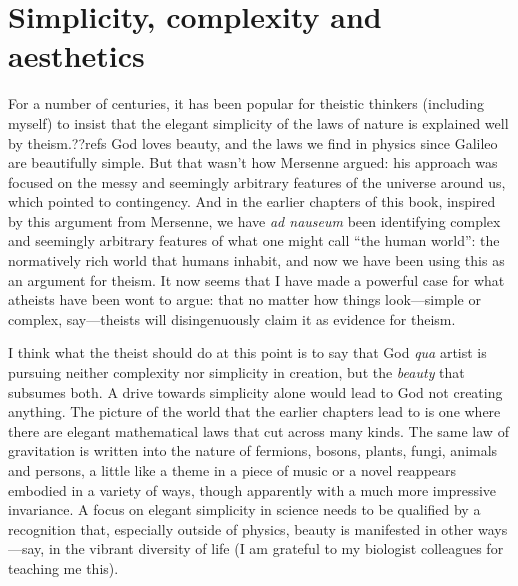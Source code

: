 \section{Simplicity, complexity and aesthetics}
For a number of centuries, it has been popular for theistic thinkers (including myself) to insist that the elegant simplicity of the laws of nature 
is explained well by theism.??refs God loves beauty, and the laws we find in physics since Galileo are beautifully simple.
But that wasn't how Mersenne argued: his approach was focused on the messy and seemingly arbitrary features of the universe
around us, which pointed to contingency. And in the earlier chapters of this book, inspired by this argument from Mersenne, we have 
\textit{ad nauseum} been identifying complex and seemingly arbitrary features of what one might call ``the human world'': 
the normatively rich world that humans inhabit, and now we have been using this as an argument for theism. It now seems that I have made a powerful case for what atheists have been wont to argue: that no matter how things look---simple or complex, say---theists will disingenuously claim it as evidence for theism.

I think what the theist should do at this point is to say that God \textit{qua} artist is pursuing neither complexity nor simplicity 
in creation, but the \textit{beauty} that subsumes both. A drive towards simplicity alone would lead to God not creating anything. 
The picture of the world that the earlier chapters lead to is one where there 
are elegant mathematical laws that cut across many kinds. The same law of gravitation is written into the nature of fermions, bosons, plants, fungi, animals and persons, a little like a theme in a piece of music or a novel reappears embodied in a variety 
of ways, though apparently with a much more impressive invariance. A focus on elegant simplicity in science needs to be qualified 
by a recognition that, especially outside of physics, beauty is manifested in other ways---say, in the vibrant diversity of 
life (I am grateful to my biologist colleagues for teaching me this). 


